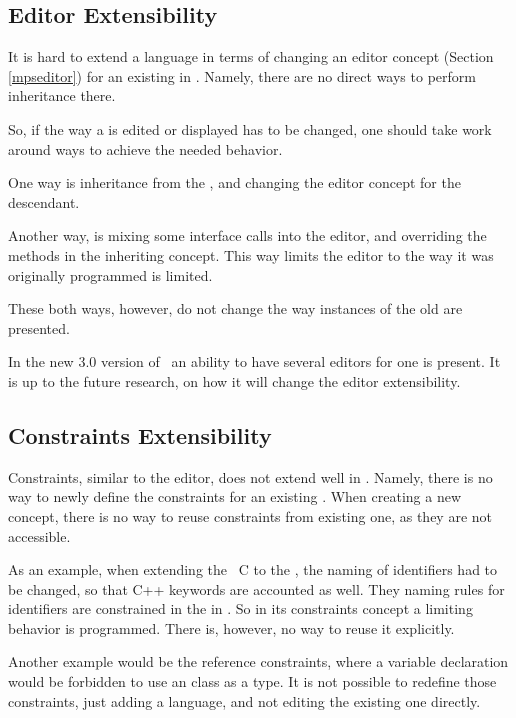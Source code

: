 \subsection{Editor Extensibility} 

It is hard to extend a language in terms of changing an editor concept (Section \ref{mpseditor}) for an existing  in \jbmps.
Namely, there are no direct ways to perform inheritance there. 

So, if the way a  is edited or displayed has to be 
changed, one should take work around ways to achieve the needed behavior. 

One way is inheritance from the , and changing the editor concept for the descendant.

Another way, is mixing some interface calls into the editor, and overriding the methods in the inheriting concept.
This way limits the editor to the way it was originally programmed is limited.

These both ways, however, do not change the way instances of the old  are presented.

In the new 3.0 version of \jbmps\ an ability to have several editors for one  is present. It is 
up to the future research, on how it will change the editor extensibility.

\subsection{Constraints Extensibility}

Constraints, similar to the editor, does not extend well in \jbmps. Namely, there is no way to newly define the constraints
for an existing . When creating a new concept, there is no way to reuse constraints from existing one, as they 
are not accessible.

As an example, when extending the \mbdr\ C to the \pcpp, the naming of identifiers had to be changed, so that C++ keywords
are accounted as well. They naming rules for identifiers are constrained in the  in \mbdr.
So in its constraints concept a limiting behavior is programmed. There is, however, no way to reuse it explicitly.

Another example would be the reference constraints, where a variable declaration would be forbidden to use an  class
as a type. It is not possible to redefine those constraints, just adding a language, and not editing the existing one directly.

